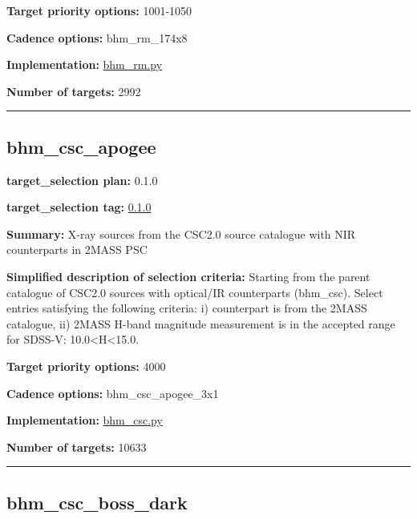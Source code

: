 \noindent\textbf{Target priority options:} 1001-1050

\noindent\textbf{Cadence options:} bhm\_rm\_174x8

\noindent\textbf{Implementation:}
\href{https://github.com/sdss/target_selection/blob/0.1.0/python/target_selection/cartons/bhm_rm.py}{bhm\_rm.py}

\noindent\textbf{Number of targets:} 2992

\begin{center}\rule{0.5\linewidth}{0.5pt}\end{center}

\hypertarget{bhm_csc_apogee_plan0.1.0}{%
\subsection{bhm\_csc\_apogee}\label{bhm_csc_apogee_plan0.1.0}}

\noindent\textbf{target\_selection plan:} 0.1.0

\noindent\textbf{target\_selection tag:}
\href{https://github.com/sdss/target_selection/tree/0.1.0/}{0.1.0}

\noindent\textbf{Summary:} X-ray sources from the CSC2.0 source catalogue with
NIR counterparts in 2MASS PSC

\noindent\textbf{Simplified description of selection criteria:} Starting from the
parent catalogue of CSC2.0 sources with optical/IR counterparts
(bhm\_csc). Select entries satisfying the following criteria: i)
counterpart is from the 2MASS catalogue, ii) 2MASS H-band magnitude
measurement is in the accepted range for SDSS-V:
10.0\textless H\textless15.0.


\noindent\textbf{Target priority options:} 4000

\noindent\textbf{Cadence options:} bhm\_csc\_apogee\_3x1

\noindent\textbf{Implementation:}
\href{https://github.com/sdss/target_selection/blob/0.1.0/python/target_selection/cartons/bhm_csc.py}{bhm\_csc.py}

\noindent\textbf{Number of targets:} 10633

\begin{center}\rule{0.5\linewidth}{0.5pt}\end{center}

\hypertarget{bhm_csc_boss_dark_plan0.1.0}{%
\subsection{bhm\_csc\_boss\_dark}\label{bhm_csc_boss_dark_plan0.1.0}}

